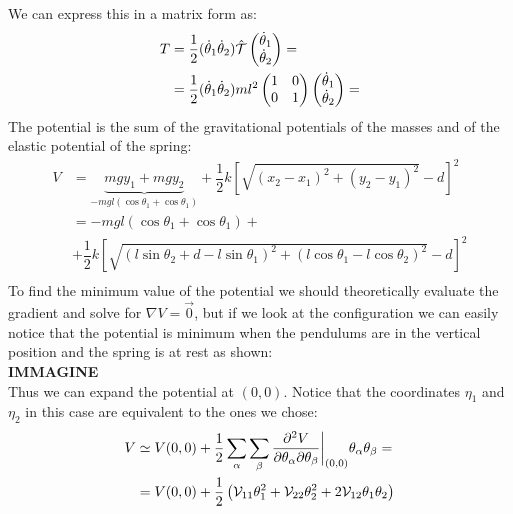 We can express this in a matrix form as:
\begin{equation}
    \begin{split}
        T &= \dfrac{1}{2}(\dot{\theta}_1 \dot{\theta}_2)\hat{\mathcal{T}}\begin{pmatrix}
            \dot{\theta}_1 \\\dot{\theta}_2
        \end{pmatrix} = \\
        &= \dfrac{1}{2}(\dot{\theta}_1 \dot{\theta}_2)ml^2\begin{pmatrix}
            1 & 0\\
            0 & 1
        \end{pmatrix}
        \begin{pmatrix}
            \dot{\theta}_1 \\\dot{\theta}_2
        \end{pmatrix} = \\
    \end{split}
\end{equation}
The potential is the sum of the gravitational potentials of the masses and of the elastic potential of the spring:
\begin{equation}
    \begin{split}
        V &= \underbrace{mgy_1 + mgy_2}_{-mgl(\cos\theta_1+\cos\theta_1)} + \dfrac{1}{2}k\left[\sqrt{(x_2-x_1)^2+(y_2-y_1)^2}-d\right]^2\\
        &= -mgl(\cos\theta_1+\cos\theta_1) +\\
        &+ \dfrac{1}{2}k\left[\sqrt{(l\sin\theta_2+d-l\sin\theta_1)^2+(l\cos\theta_1-l\cos\theta_2)^2}-d\right]^2\\
    \end{split}
\end{equation}
To find the minimum value of the potential we should theoretically evaluate the gradient and solve for $\nabla V = \vec{0}$, but if we look at the configuration we can easily notice that the potential is minimum when the pendulums are in the vertical position and the spring is at rest as shown:
\\\textbf{IMMAGINE}\\
Thus we can expand the potential at $(0,0)$. Notice that the coordinates $\eta_1$ and $\eta_2$ in this case are equivalent to the ones we chose:
\begin{equation}
    \begin{split}
        V &\simeq V(0,0) +\dfrac{1}{2}\displaystyle\sum_{\alpha}\displaystyle\sum_{\beta} \dfrac{\partial^2 V}{\partial \theta_{\alpha} \partial \theta_{\beta}}\bigg|_{(0,0)}\theta_{\alpha}\theta_{\beta} = \\
        &= V(0,0) +\dfrac{1}{2}\left(\mathcal{V}_{11}\theta_1^2 + \mathcal{V}_{22}\theta_2^2 + 2\mathcal{V}_{12}\theta_1\theta_2\right)
    \end{split}
\end{equation}
